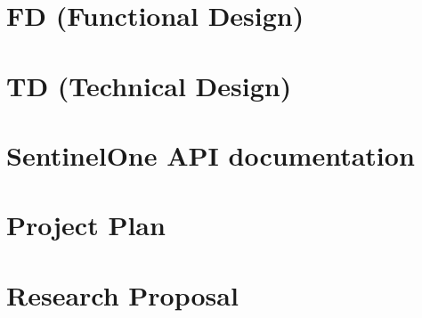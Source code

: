 \appendix

\chapter{FD (Functional Design)}
% 
\newpage

\chapter{TD (Technical Design)}
% 
\newpage

\chapter{SentinelOne API documentation}
% 
\newpage

% 

% 

\chapter{Project Plan}
% 
\newpage

\chapter{Research Proposal}
% 
\newpage